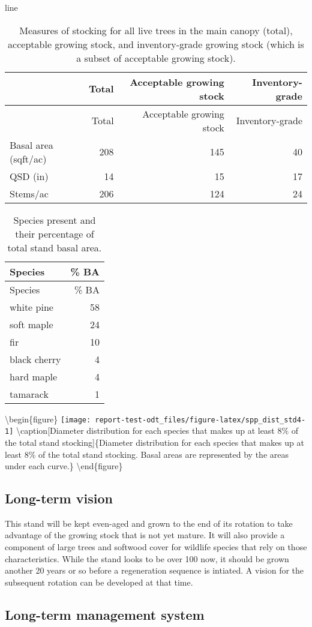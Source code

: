 \documentclass[]{tufte-handout}
\begin{document}
line

\begin{longtable}[]{@{}lrrr@{}}
\caption{Measures of stocking for all live trees in the main canopy
(total), acceptable growing stock, and inventory-grade growing stock
(which is a subset of acceptable growing stock).}\tabularnewline
\toprule
& Total & Acceptable growing stock & Inventory-grade\tabularnewline
\midrule
\endfirsthead
\toprule
& Total & Acceptable growing stock & Inventory-grade\tabularnewline
\midrule
\endhead
Basal area (sqft/ac) & 208 & 145 & 40\tabularnewline
QSD (in) & 14 & 15 & 17\tabularnewline
Stems/ac & 206 & 124 & 24\tabularnewline
\bottomrule
\end{longtable}

\begin{longtable}[]{@{}lr@{}}
\caption{Species present and their percentage of total stand basal
area.}\tabularnewline
\toprule
Species & \% BA\tabularnewline
\midrule
\endfirsthead
\toprule
Species & \% BA\tabularnewline
\midrule
\endhead
white pine & 58\tabularnewline
soft maple & 24\tabularnewline
fir & 10\tabularnewline
black cherry & 4\tabularnewline
hard maple & 4\tabularnewline
tamarack & 1\tabularnewline
\bottomrule
\end{longtable}

\textbackslash{}begin\{figure\}
\texttt{[image: report-test-odt\_files/figure-latex/spp\_dist\_std4-1]}
\textbackslash{}caption{[}Diameter distribution for each species that
makes up at least 8\% of the total stand stocking{]}\{Diameter
distribution for each species that makes up at least 8\% of the total
stand stocking. Basal areas are represented by the areas under each
curve.\}\label{fig:spp_dist_std4} \textbackslash{}end\{figure\}

\subsection{Long-term vision}\label{long-term-vision-3}

This stand will be kept even-aged and grown to the end of its rotation
to take advantage of the growing stock that is not yet mature. It will
also provide a component of large trees and softwood cover for wildlife
species that rely on those characteristics. While the stand looks to be
over 100 now, it should be grown another 20 years or so before a
regeneration sequence is intiated. A vision for the subsequent rotation
can be developed at that time.

\subsection{Long-term management
system}\label{long-term-management-system-3}
\end{document}
